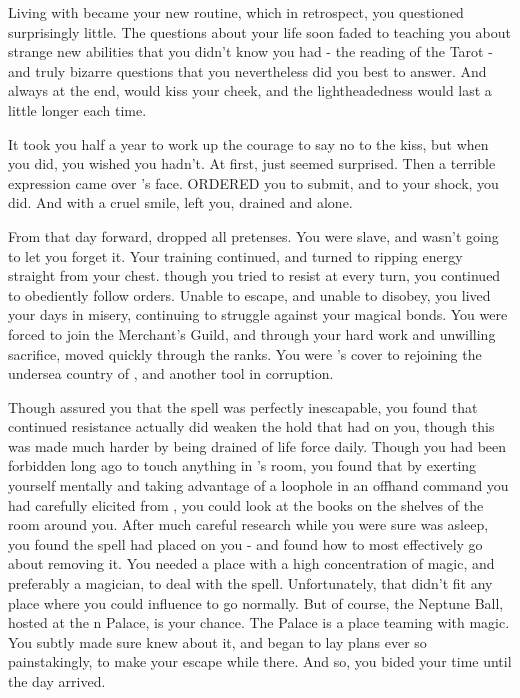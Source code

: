 \documentclass[char]{NeptuneBall}
\begin{document}
Living with \cWitch{\them} became your new routine, which in retrospect, you questioned surprisingly little. The questions about your life soon faded to \cWitch{\them} teaching you about strange new abilities that you didn't know you had - the reading of the Tarot - and truly bizarre questions that you nevertheless did you best to answer. And always at the end, \cWitch{\they} would kiss your cheek, and the lightheadedness would last a little longer each time.

It took you half a year to work up the courage to say no to the kiss, but when you did, you wished you hadn't. At first, \cWitch{\they} just seemed surprised. Then a terrible expression came over \cWitch{\their}'s face. \cWitch{} ORDERED you to submit, and to your shock, you did. And with a cruel smile, \cWitch{\they} left you, drained and alone.

From that day forward, \cWitch{} dropped all pretenses. You were \cWitch{\their} slave, and \cWitch{\they} wasn't going to let you forget it. Your training continued, and \cWitch{\they} turned to ripping energy straight from your chest. though you tried to resist \cWitch{\them} at every turn, you continued to obediently follow orders. Unable to escape, and unable to disobey, you lived your days in misery, continuing to struggle against your magical bonds. You were forced to join the Merchant's Guild, and through your hard work and unwilling sacrifice, moved quickly through the ranks. You were \cWitch{}'s cover to rejoining the undersea country of \pAtlantis{}, and another tool in \cWitch{\their} corruption.

Though \cWitch{\they} assured you that the spell was perfectly inescapable, you found that continued resistance actually did weaken the hold that \cWitch{\they} had on you, though this was made much harder by being drained of life force daily. Though you had been forbidden long ago to touch anything in \cWitch{}'s room, you found that by exerting yourself mentally and taking advantage of a loophole in an offhand command you had carefully elicited from \cWitch{\them}, you could look at the books on the shelves of the room around you. After much careful research while you were sure \cWitch{} was asleep, you found the spell \cWitch{\they} had placed on you - and found how to most effectively go about removing it. You needed a place with a high concentration of magic, and preferably a magician, to deal with the spell. Unfortunately, that didn't fit any place where you could influence \cWitch{} to go normally. But of course, the Neptune Ball, hosted at the \pAtlantis{}n Palace, is your chance. The Palace is a place teaming with magic. You subtly made sure \cWitch{} knew about it, and began to lay plans ever so painstakingly, to make your escape while there. And so, you bided your time until the day arrived.
\end{document}
